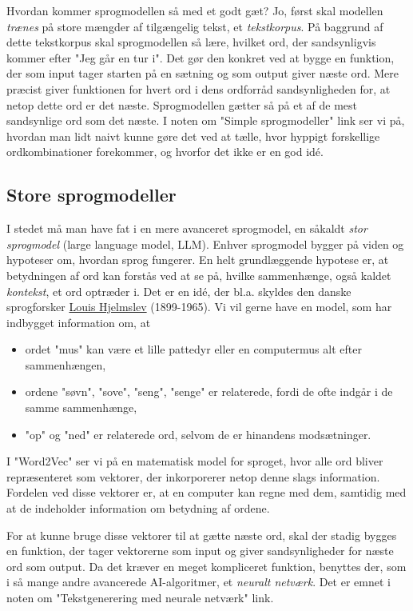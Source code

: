 \documentclass{article}
\newcommand{\am}[1]{{\color{red} #1}}
\begin{document}
Hvordan kommer sprogmodellen så med et godt gæt? Jo, først skal modellen \emph{trænes} på store mængder af tilgængelig tekst, et \emph{tekstkorpus}.  På baggrund af dette tekstkorpus skal sprogmodellen så lære, hvilket ord, der sandsynligvis kommer efter "Jeg går en tur i". Det gør den konkret ved at bygge en funktion, der som input tager starten på en sætning og som output giver  næste ord. Mere præcist giver funktionen for hvert ord i dens ordforråd sandsynligheden for, at netop dette ord er det næste. Sprogmodellen gætter så på et af de mest sandsynlige ord som det næste. I noten om "Simple sprogmodeller" \am{link} ser vi på, hvordan man lidt naivt kunne gøre det ved at tælle, hvor hyppigt forskellige ordkombinationer forekommer, og hvorfor det ikke er en god idé.


\subsection*{Store sprogmodeller}

I stedet må man have fat i en mere avanceret sprogmodel, en såkaldt \emph{stor sprogmodel} (large language model, LLM).
Enhver sprogmodel bygger på viden og hypoteser om, hvordan sprog fungerer. En helt grundlæggende hypotese er, at betydningen af ord kan forstås ved at se på, hvilke sammenhænge, også kaldet \emph{kontekst}, et ord optræder i. Det er en idé, der bl.a. skyldes den danske sprogforsker \href{https://lex.dk/Louis_Hjelmslev}{Louis Hjelmslev} (1899-1965). Vi vil gerne have en model, som har indbygget information om, at 
\begin{itemize}
    \item ordet "mus" kan være et lille pattedyr eller en computermus alt efter sammenhængen,
    \item ordene "søvn", "sove", "seng", "senge" er relaterede, fordi de ofte indgår i de samme sammenhænge,
    \item "op" og "ned" er relaterede ord, selvom de er hinandens modsætninger.
\end{itemize}
I "Word2Vec" ser vi på en matematisk model for sproget, hvor alle ord bliver repræsenteret som vektorer, der inkorporerer netop denne slags information.
Fordelen ved disse vektorer er, at en computer kan regne med dem, samtidig med at de indeholder information om betydning af ordene. 

For at kunne bruge disse vektorer til at gætte næste ord, skal der stadig bygges en funktion, der tager vektorerne som input og giver sandsynligheder for næste ord som output. Da det kræver en meget kompliceret funktion, benyttes der, som i så mange andre avancerede AI-algoritmer, et \emph{neuralt netværk}. Det er emnet i noten om "Tekstgenerering med neurale netværk" \am{link}. 
\end{document}
